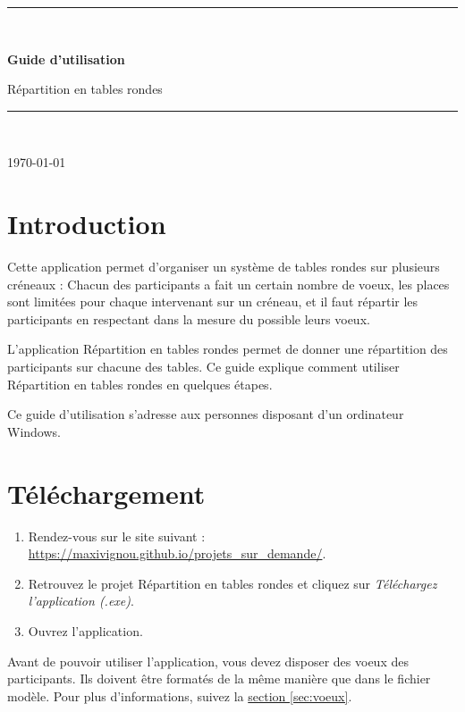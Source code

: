 \documentclass[11pt,a4paper]{article}
\newcommand{\nomproduit}{Répartition en tables rondes}
\begin{document}
\begin{titlepage}
  \centering
  \vspace*{4cm}
  {\color{principale}\rule{\linewidth}{1.5pt}}\\[0.8cm]
  {\Huge\bfseries\color{principale} Guide d'utilisation\par}
  \vspace{0.5cm}
  {\LARGE \nomproduit\par}
  \vspace{0.4cm}
  {\color{principale}\rule{\linewidth}{1.5pt}}\\[2cm]
  {\large \today\par}
\end{titlepage}

\tableofcontents
\clearpage

\section{Introduction}
\label{sec:introduction}
Cette application permet d'organiser un système de tables rondes sur plusieurs créneaux : Chacun des participants a fait un certain nombre de voeux, les places sont limitées pour chaque intervenant sur un créneau, et il faut répartir les participants en respectant dans la mesure du possible leurs voeux.

L'application \nomproduit{} permet de donner une répartition des participants sur chacune des tables.
Ce guide explique comment utiliser \nomproduit{} en quelques étapes.

\begin{note}
Ce guide d'utilisation s'adresse aux personnes disposant d'un ordinateur Windows.
\end{note}

\section{Téléchargement}
\label{sec:telechargement}
\begin{enumerate}
  \item Rendez-vous sur le site suivant : \url{https://maxivignou.github.io/projets_sur_demande/}.
  \item Retrouvez le projet \nomproduit{} et cliquez sur \textit{Téléchargez l'application (.exe)}.
  \item Ouvrez l'application.
\end{enumerate}

\begin{astuce}
Avant de pouvoir utiliser l'application, vous devez disposer des voeux des participants. Ils doivent être formatés de la même manière que dans le fichier modèle. Pour plus d'informations, suivez la \hyperref[sec:voeux]{section \ref{sec:voeux}}.
\end{astuce}
\end{document}
